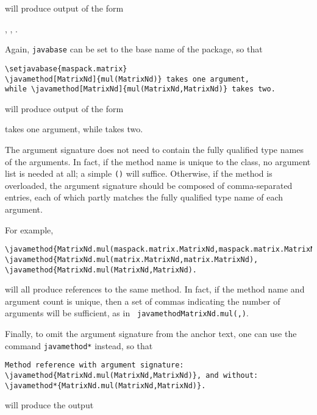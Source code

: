 \documentclass{article}
\begin{document}
will produce output of the form

\setjavabase{}
, 
,
.

Again, {\tt \BKS javabase} can
be set to the base name of the package, so that

\begin{lstlisting}
\setjavabase{maspack.matrix}
\javamethod[MatrixNd]{mul(MatrixNd)} takes one argument,
while \javamethod[MatrixNd]{mul(MatrixNd,MatrixNd)} takes two.
\end{lstlisting}

will produce output of the form

 takes one argument,
while  takes two.

The argument signature does not need to contain the fully qualified
type names of the arguments. In fact, if the method name is unique to
the class, no argument list is needed at all; a simple {\tt ()} will
suffice.  Otherwise, if the method is overloaded, the argument
signature should be composed of comma-separated entries, each of which
partly matches the fully qualified type name of each argument.

For example,

\begin{lstlisting}
\javamethod{MatrixNd.mul(maspack.matrix.MatrixNd,maspack.matrix.MatrixNd), 
\javamethod{MatrixNd.mul(matrix.MatrixNd,matrix.MatrixNd),
\javamethod{MatrixNd.mul(MatrixNd,MatrixNd).
\end{lstlisting}

will all produce references to the same method. In fact, if the method
name and argument count is unique, then a set of commas indicating the
number of arguments will be sufficient, as in {\tt
\BKS javamethod{MatrixNd.mul(,)}}.

Finally, to omit the argument signature from
the anchor text, one can use the command {\tt \BKS javamethod*}
instead, so that

\begin{lstlisting}
Method reference with argument signature:
\javamethod{MatrixNd.mul(MatrixNd,MatrixNd)}, and without:
\javamethod*{MatrixNd.mul(MatrixNd,MatrixNd)}.
\end{lstlisting}

will produce the output
\end{document}
